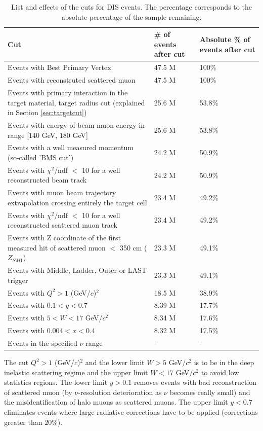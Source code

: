 \begin{table}[!h]
  \centering
  \caption{List and effects of the cuts for DIS events. The percentage corresponds to the absolute percentage of the sample remaining.}
  \label{tab:DIScuts}
  \begin{tabular}{p{10cm} p{2cm} p{2cm}}
    \hline
    \hline
     Cut & \# of events after cut & Absolute \% of events after cut  \\
    \hline
    \hline
    Events with Best Primary Vertex & 47.5 M & 100\% \\
    Events with reconstruted scattered muon & 47.5 M & 100\% \\
    Events with primary interaction in the target material, target radius cut (explained in Section \ref{sec:targetcut}) & 25.6 M & 53.8\% \\
    Events with energy of beam muon energy in range [$140$ GeV, $180$ GeV] & 25.6 M & 53.8\% \\
    Events with a well measured momentum (so-called 'BMS cut') & 24.2 M & 50.9\% \\
    Events with $\chi^2$/ndf $<$ 10 for a well reconstructed beam track & 24.2 M & 50.9\% \\
    Events with muon beam trajectory extrapolation crossing entirely the target cell & 23.4 M & 49.2\% \\
    Events with $\chi^2$/ndf $<$ 10 for a well reconstructed scattered muon track & 23.4 M & 49.2\% \\
    Events with Z coordinate of the first measured hit of scattered muon $<$ 350 cm ($Z_{SM1}$) & 23.3 M & 49.1\% \\
    Events with Middle, Ladder, Outer or LAST trigger & 23.3 M & 49.1\% \\
    Events with $Q^2>1$ (GeV/$c$)$^2$ & 18.5 M & 38.9\% \\
    Events with $0.1 < y < 0.7$ & 8.39 M & 17.7\% \\
    Events with $5 < W < 17$ GeV/$c^2$ & 8.34 M & 17.6\% \\
    Events with $0.004 < x < 0.4$ & 8.32 M & 17.5\% \\
    Events in the specified $\nu$ range & - & - \\
    \hline
    \hline
  \end{tabular}
\end{table}

The cut $Q^2>1$ (GeV/$c$)$^2$ and the lower limit $W > 5$ GeV/$c^2$ is to be in the deep inelastic scattering regime and the upper limit $W < 17$ GeV/$c^2$ to avoid low statistics regions. The lower limit $y > 0.1$ removes events with bad reconstruction of scattered muon (by $\nu$-resolution deterioration as $\nu$ becomes really small) and the misidentification of halo muons as scattered muons. The upper limit $y < 0.7$ eliminates events where large radiative corrections have to be applied (corrections greater than $20$\%).

